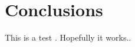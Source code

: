\documentclass[../main.tex]{subfiles}
\begin{document}
                                                
\chapter{Conclusions}                                 
This is a test \cite{shaw97}. Hopefully it works..              
\biblio                                                         
\end{document}
